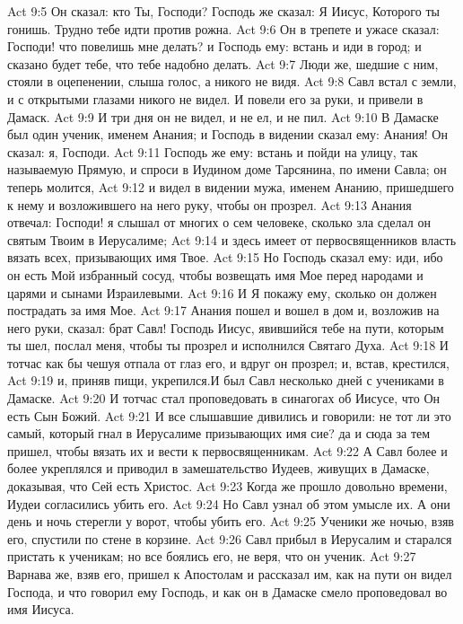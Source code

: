\vs Act 9:5 Он сказал: кто Ты, Господи? Господь же сказал: Я Иисус, Которого ты гонишь. Трудно тебе идти против рожна.
\vs Act 9:6 Он в трепете и ужасе сказал: Господи! что повелишь мне делать? и Господь  ему: встань и иди в город; и сказано будет тебе, что тебе надобно делать.
\vs Act 9:7 Люди же, шедшие с ним, стояли в оцепенении, слыша голос, а никого не видя.
\vs Act 9:8 Савл встал с земли, и с открытыми глазами никого не видел. И повели его за руки, и привели в Дамаск.
\vs Act 9:9 И три дня он не видел, и не ел, и не пил.
\rsbpar\vs Act 9:10 В Дамаске был один ученик, именем Анания; и Господь в видении сказал ему: Анания! Он сказал: я, Господи.
\vs Act 9:11 Господь же  ему: встань и пойди на улицу, так называемую Прямую, и спроси в Иудином доме Тарсянина, по имени Савла; он теперь молится,
\vs Act 9:12 и видел в видении мужа, именем Ананию, пришедшего к нему и возложившего на него руку, чтобы он прозрел.
\vs Act 9:13 Анания отвечал: Господи! я слышал от многих о сем человеке, сколько зла сделал он святым Твоим в Иерусалиме;
\vs Act 9:14 и здесь имеет от первосвященников власть вязать всех, призывающих имя Твое.
\vs Act 9:15 Но Господь сказал ему: иди, ибо он есть Мой избранный сосуд, чтобы возвещать имя Мое перед народами и царями и сынами Израилевыми.
\vs Act 9:16 И Я покажу ему, сколько он должен пострадать за имя Мое.
\vs Act 9:17 Анания пошел и вошел в дом и, возложив на него руки, сказал: брат Савл! Господь Иисус, явившийся тебе на пути, которым ты шел, послал меня, чтобы ты прозрел и исполнился Святаго Духа.
\vs Act 9:18 И тотчас как бы чешуя отпала от глаз его, и вдруг он прозрел; и, встав, крестился,
\vs Act 9:19 и, приняв пищи, укрепился.\rsbpar И был Савл несколько дней с учениками в Дамаске.
\vs Act 9:20 И тотчас стал проповедовать в синагогах об Иисусе, что Он есть Сын Божий.
\vs Act 9:21 И все слышавшие дивились и говорили: не тот ли это самый, который гнал в Иерусалиме призывающих имя сие? да и сюда за тем пришел, чтобы вязать их и вести к первосвященникам.
\vs Act 9:22 А Савл более и более укреплялся и приводил в замешательство Иудеев, живущих в Дамаске, доказывая, что Сей есть Христос.
\rsbpar\vs Act 9:23 Когда же прошло довольно времени, Иудеи согласились убить его.
\vs Act 9:24 Но Савл узнал об этом умысле их. А они день и ночь стерегли у ворот, чтобы убить его.
\vs Act 9:25 Ученики же ночью, взяв его, спустили по стене в корзине.
\vs Act 9:26 Савл прибыл в Иерусалим и старался пристать к ученикам; но все боялись его, не веря, что он ученик.
\vs Act 9:27 Варнава же, взяв его, пришел к Апостолам и рассказал им, как на пути он видел Господа, и что говорил ему Господь, и как он в Дамаске смело проповедовал во имя Иисуса.
